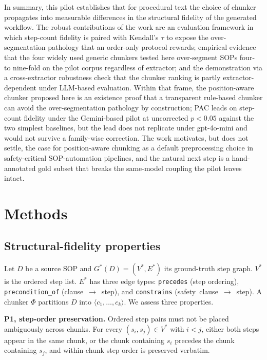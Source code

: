 \documentclass[fleqn,10pt]{wlscirep}
\begin{document}
In summary, this pilot establishes that for procedural text the choice
of chunker propagates into measurable differences in the structural
fidelity of the generated workflow. The robust contributions of the
work are an evaluation framework in which step-count fidelity is
paired with Kendall's $\tau$ to expose the over-segmentation pathology
that an order-only protocol rewards; empirical evidence that the four
widely used generic chunkers tested here over-segment SOPs four- to
nine-fold on the pilot corpus regardless of extractor; and the
demonstration via a cross-extractor robustness check that the
chunker ranking is partly extractor-dependent under LLM-based
evaluation. Within that frame, the position-aware chunker proposed
here is an existence proof that a transparent rule-based chunker can
avoid the over-segmentation pathology by construction; PAC leads on
step-count fidelity under the Gemini-based pilot at uncorrected
$p<0.05$ against the two simplest baselines, but the lead does not
replicate under gpt-4o-mini and would not survive a family-wise
correction. The work motivates, but does not settle, the case for
position-aware chunking as a default preprocessing choice in
safety-critical SOP-automation pipelines, and the natural next step is
a hand-annotated gold subset that breaks the same-model coupling
the pilot leaves intact.

\section*{Methods}

\subsection*{Structural-fidelity properties}

Let $D$ be a source SOP and $G^{*}(D)=(V^{*},E^{*})$ its ground-truth
step graph. $V^{*}$ is the ordered step list. $E^{*}$ has three edge
types: \texttt{precedes} (step ordering), \texttt{precondition\_of}
(clause~$\rightarrow$~step), and \texttt{constrains}
(safety~clause~$\rightarrow$~step). A chunker $\Phi$ partitions $D$ into
$\langle c_{1},\dots,c_{k}\rangle$. We assess three properties.

\textbf{P1, step-order preservation.} Ordered step pairs must not be
placed ambiguously across chunks. For every $(s_i, s_j)\in V^{*}$ with
$i<j$, either both steps appear in the same chunk, or the chunk
containing $s_i$ precedes the chunk containing $s_j$, and within-chunk
step order is preserved verbatim.
\end{document}
